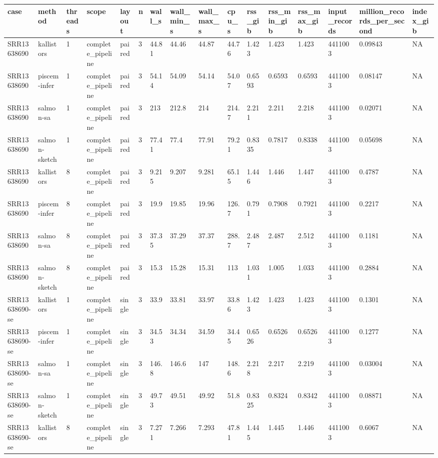 \begin{tabular}{llllllllllllllll}
\toprule
case & method & threads & scope & layout & n & wall\_s & wall\_min\_s & wall\_max\_s & cpu\_s & rss\_gib & rss\_min\_gib & rss\_max\_gib & input\_records & million\_records\_per\_second & index\_gib \\
\midrule
SRR13638690 & kallistors & 1 & complete\_pipeline & paired & 3 & 44.81 & 44.46 & 44.87 & 44.76 & 1.423 & 1.423 & 1.423 & 4411003 & 0.09843 & NA \\
SRR13638690 & piscem-infer & 1 & complete\_pipeline & paired & 3 & 54.14 & 54.09 & 54.14 & 54.07 & 0.6593 & 0.6593 & 0.6593 & 4411003 & 0.08147 & NA \\
SRR13638690 & salmon-sa & 1 & complete\_pipeline & paired & 3 & 213 & 212.8 & 214 & 214.7 & 2.211 & 2.211 & 2.218 & 4411003 & 0.02071 & NA \\
SRR13638690 & salmon-sketch & 1 & complete\_pipeline & paired & 3 & 77.41 & 77.4 & 77.91 & 79.21 & 0.8335 & 0.7817 & 0.8338 & 4411003 & 0.05698 & NA \\
SRR13638690 & kallistors & 8 & complete\_pipeline & paired & 3 & 9.215 & 9.207 & 9.281 & 65.15 & 1.446 & 1.446 & 1.447 & 4411003 & 0.4787 & NA \\
SRR13638690 & piscem-infer & 8 & complete\_pipeline & paired & 3 & 19.9 & 19.85 & 19.96 & 126.7 & 0.791 & 0.7908 & 0.7921 & 4411003 & 0.2217 & NA \\
SRR13638690 & salmon-sa & 8 & complete\_pipeline & paired & 3 & 37.35 & 37.29 & 37.37 & 288.7 & 2.487 & 2.487 & 2.512 & 4411003 & 0.1181 & NA \\
SRR13638690 & salmon-sketch & 8 & complete\_pipeline & paired & 3 & 15.3 & 15.28 & 15.31 & 113 & 1.031 & 1.005 & 1.033 & 4411003 & 0.2884 & NA \\
SRR13638690-se & kallistors & 1 & complete\_pipeline & single & 3 & 33.9 & 33.81 & 33.97 & 33.86 & 1.423 & 1.423 & 1.423 & 4411003 & 0.1301 & NA \\
SRR13638690-se & piscem-infer & 1 & complete\_pipeline & single & 3 & 34.53 & 34.34 & 34.59 & 34.45 & 0.6526 & 0.6526 & 0.6526 & 4411003 & 0.1277 & NA \\
SRR13638690-se & salmon-sa & 1 & complete\_pipeline & single & 3 & 146.8 & 146.6 & 147 & 148.6 & 2.218 & 2.217 & 2.219 & 4411003 & 0.03004 & NA \\
SRR13638690-se & salmon-sketch & 1 & complete\_pipeline & single & 3 & 49.73 & 49.51 & 49.92 & 51.8 & 0.8325 & 0.8324 & 0.8342 & 4411003 & 0.08871 & NA \\
SRR13638690-se & kallistors & 8 & complete\_pipeline & single & 3 & 7.271 & 7.266 & 7.293 & 47.81 & 1.445 & 1.445 & 1.446 & 4411003 & 0.6067 & NA \\

\end{tabular}
